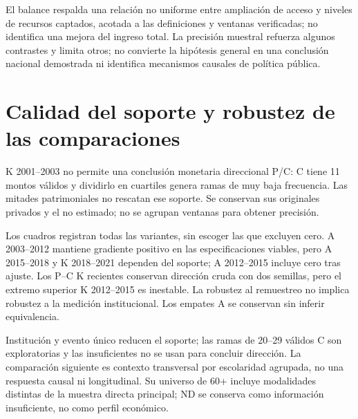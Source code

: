 El balance respalda una relación no uniforme entre ampliación de acceso
y niveles de recursos captados, acotada a las definiciones y ventanas
verificadas; no identifica una mejora del ingreso total.
La precisión muestral refuerza algunos contrastes y limita otros;
no convierte la hipótesis general en una conclusión nacional demostrada
ni identifica mecanismos causales de política pública.



\section{Calidad del soporte y robustez de las comparaciones}
\label{sec:resultados-calidad10}

K 2001--2003 no permite una conclusión monetaria direccional P/C: C tiene
11 montos válidos y dividirlo en cuartiles genera ramas de muy baja frecuencia.
Las mitades patrimoniales no rescatan ese soporte. Se conservan sus originales
privados y el no estimado; no se agrupan ventanas para obtener precisión.




Los cuadros registran todas las variantes, sin escoger las que excluyen cero.
A 2003--2012 mantiene gradiente positivo en las especificaciones viables,
pero A 2015--2018 y K 2018--2021 dependen del soporte; A 2012--2015 incluye
cero tras ajuste. Los P--C K recientes conservan dirección cruda con dos
semillas, pero el extremo superior K 2012--2015 es inestable. La robustez
al remuestreo no implica robustez a la medición institucional. Los empates A
se conservan sin inferir equivalencia.



Institución y evento único reducen el soporte; las ramas de 20--29 válidos
C son exploratorias y las insuficientes no se usan para concluir dirección.
La comparación siguiente es contexto transversal por escolaridad agrupada,
no una respuesta causal ni longitudinal. Su universo de 60+ incluye modalidades
distintas de la muestra directa principal; ND se conserva como información
insuficiente, no como perfil económico.

